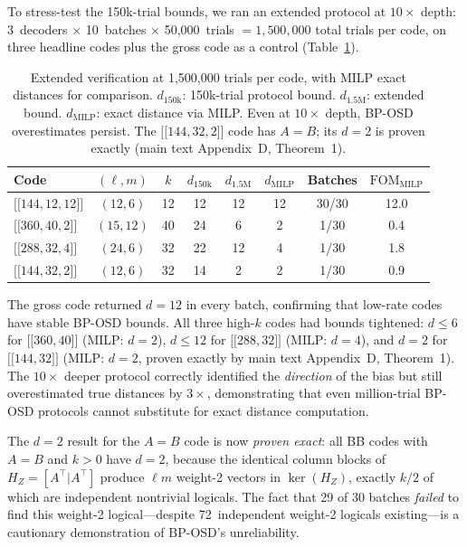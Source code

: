 \documentclass[aps,prxquantum,twocolumn,superscriptaddress,nofootinbib]{revtex4-2}
\newcommand{\dblbrk}[1]{\ensuremath{\lbrack\!\lbrack #1 \rbrack\!\rbrack}}
\newcommand{\code}[1]{\dblbrk{#1}}
\newcommand{\FOM}{\ensuremath{\mathrm{FOM}}}
\begin{document}
To stress-test the 150k-trial bounds, we ran an extended protocol at $10\times$ depth: 3~decoders $\times$ 10~batches $\times$ 50{,}000~trials $= 1{,}500{,}000$ total trials per code, on three headline codes plus the gross code as a control (Table~\ref{tab:extended}).

\begin{table}[h]
\centering
\caption{Extended verification at 1{,}500{,}000 trials per code, with MILP exact distances for comparison.
$d_{150\text{k}}$: 150k-trial protocol bound.
$d_{1.5\text{M}}$: extended bound.
$d_{\text{MILP}}$: exact distance via MILP.
Even at $10\times$ depth, BP-OSD overestimates persist.
The $\code{144,32,2}$ code has $A = B$; its $d = 2$ is proven exactly (main text Appendix~D, Theorem~1).}
\label{tab:extended}
\footnotesize
\begin{tabular}{lccccccc}
\toprule
Code & $(\ell,m)$ & $k$ & $d_{150\text{k}}$ & $d_{1.5\text{M}}$ & $d_{\text{MILP}}$ & Batches & $\FOM_{\text{MILP}}$ \\
\midrule
$\code{144,12,12}$ & $(12,6)$ & 12 & 12 & 12 & 12 & 30/30 & 12.0 \\
$\code{360,40,2}$ & $(15,12)$ & 40 & 24 & 6 & 2 & 1/30 & 0.4 \\
$\code{288,32,4}$ & $(24,6)$ & 32 & 22 & 12 & 4 & 1/30 & 1.8 \\
$\code{144,32,2}$ & $(12,6)$ & 32 & 14 & 2 & 2 & 1/30 & 0.9 \\
\bottomrule
\end{tabular}
\end{table}

The gross code returned $d = 12$ in every batch, confirming that low-rate codes have stable BP-OSD bounds.
All three high-$k$ codes had bounds tightened: $d \leq 6$ for $\code{360,40}$ (MILP: $d = 2$), $d \leq 12$ for $\code{288,32}$ (MILP: $d = 4$), and $d = 2$ for $\code{144,32}$ (MILP: $d = 2$, proven exactly by main text Appendix~D, Theorem~1).
The $10\times$ deeper protocol correctly identified the \emph{direction} of the bias but still overestimated true distances by $3\times$, demonstrating that even million-trial BP-OSD protocols cannot substitute for exact distance computation.

The $d = 2$ result for the $A = B$ code is now \emph{proven exact}: all BB codes with $A = B$ and $k > 0$ have $d = 2$, because the identical column blocks of $H_Z = [A^\top | A^\top]$ produce $\ell m$ weight-2 vectors in $\ker(H_Z)$, exactly $k/2$ of which are independent nontrivial logicals.
The fact that 29 of 30 batches \emph{failed} to find this weight-2 logical---despite 72~independent weight-2 logicals existing---is a cautionary demonstration of BP-OSD's unreliability.
\end{document}
